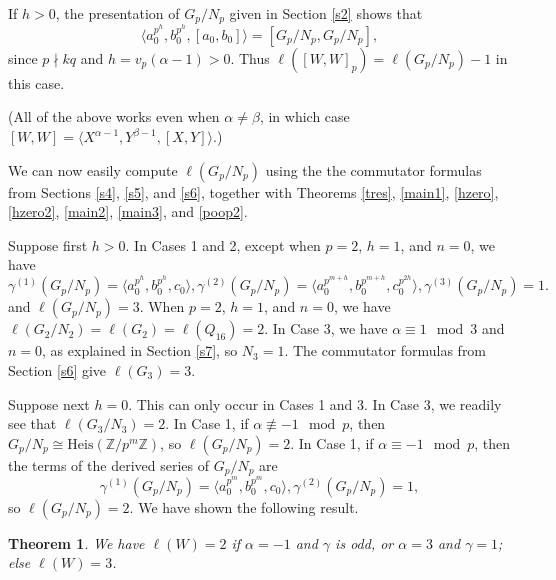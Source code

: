 \documentclass{amsart}
\newtheorem{theorem}{Theorem}[section]
\theoremstyle{definition}
\theoremstyle{remark}
\newcommand \Z{{\mathbb Z}}
\begin{document}
{If $h>0$, the presentation of $G_p/N_p$ given in Section \ref{s2} shows that
$$
\langle a_0^{p^h}, b_0^{p^h}, [a_0,b_0]\rangle=[G_p/N_p, G_p/N_p],
$$
since $p\nmid kq$ and $h=v_p(\alpha-1)>0$. Thus $\ell([W,W]_p)=\ell(G_p/N_p)-1$ in this case.

(All of the above works even when $\alpha\neq\beta$, in which case $[W,W]=\langle X^{\alpha-1}, Y^{\beta-1}, [X,Y]\rangle$.)

We can now easily compute $\ell(G_p/N_p)$ using the the commutator formulas from Sections \ref{s4}, 
\ref{s5}, and \ref{s6}, together with Theorems \ref{tres}, \ref{main1}, \ref{hzero}, \ref{hzero2}, \ref{main2}, \ref{main3}, and \ref{poop2}.

Suppose first $h>0$. In Cases 1 and 2, except when $p=2$, $h=1$, and $n=0$, we have
$$
\gamma^{(1)}(G_p/N_p)=\langle a_0^{p^{h}}, b_0^{p^{h}}, c_0\rangle,
\gamma^{(2)}(G_p/N_p)=\langle a_0^{p^{m+h}}, b_0^{p^{m+h}}, c_0^{p^{2h}}\rangle,
\gamma^{(3)}(G_p/N_p)=1.
$$
and $\ell(G_p/N_p)=3$. When $p=2$, $h=1$, and $n=0$, we have $\ell(G_2/N_2)=\ell(G_2)=\ell(Q_{16})=2$.
In Case 3, we have $\alpha\equiv 1\mod 3$ and $n=0$,
as explained in Section \ref{s7}, so $N_3=1$. The commutator formulas from Section \ref{s6} give $\ell(G_3)=3$.

Suppose next $h=0$. This can only occur in Cases 1 and 3.
In Case 3, we readily see that $\ell(G_3/N_3)=2$. In Case 1, if $\alpha\not\equiv -1\mod p$, then $G_p/N_p\cong\mathrm{Heis}(\Z/p^m\Z)$,
so $\ell(G_p/N_p)=2$. In Case 1, if $\alpha\equiv -1\mod p$, then the terms of the derived
series of $G_p/N_p$ are 
$$
\gamma^{(1)}(G_p/N_p)=\langle a_0^{p^{m}}, b_0^{p^{m}}, c_0\rangle,
\gamma^{(2)}(G_p/N_p)=1,
$$
so $\ell(G_p/N_p)=2$. We have shown the following result.

\begin{theorem}\label{solv} We have $\ell(W)=2$ if $\alpha=-1$ and $\gamma$ is odd, or $\alpha=3$ and $\gamma=1$; else
$\ell(W)=3$.
\end{theorem}











}
\end{document}
